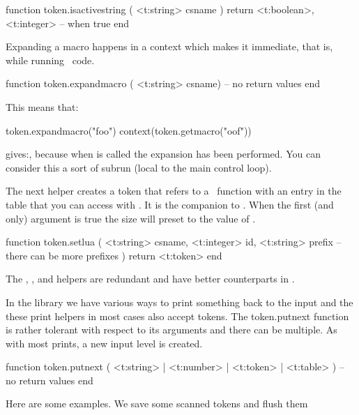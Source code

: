 \starttyping[option=LUA]
function token.isactivestring ( <t:string> csname )
    return
        <t:boolean>,
        <t:integer>  -- when true
end
\stoptyping

Expanding a macro happens in a  context which makes it
immediate, that is, while running \LUA\ code.

\starttyping[option=LUA]
function token.expandmacro ( <t:string> csname)
    -- no return values
end
\stoptyping

This means that:

\startbuffer
\def\foo{\scratchdimen100pt \edef\oof{\the\scratchdimen}}
\startluacode
token.expandmacro("foo")
context(token.getmacro("oof"))
\stopluacode
\stopbuffer

\typebuffer

gives:\inlinebuffer, because when  is called the expansion has
been performed. You can consider this a sort of subrun (local to the main control
loop).

The next helper creates a token that refers to a \LUA\ function with an entry in
the table that you can access with . It is the
companion to \type {\luadef}. When the first (and only) argument is true the size
will preset to the value of .

\starttyping[option=LUA]
function token.setlua (
    <t:string>  csname,
    <t:integer> id,
    <t:string>  prefix
 -- there can be more prefixes
)
    return <t:token>
end
\stoptyping

The , , 
and  helpers are redundant and have better counterparts
in .

\stopsubsection

\startsubsection[title={Writers}]

In the  library we have various ways to print something back to the
input and the these print helpers in most cases also accept tokens. The \type
{token.putnext} function is rather tolerant with respect to its arguments and
there can be multiple. As with most prints, a new input level is created.

\starttyping[option=LUA]
function token.putnext ( <t:string> | <t:number> | <t:token> | <t:table> )
    -- no return values
end
\stoptyping

Here are some examples. We save some scanned tokens and flush them

